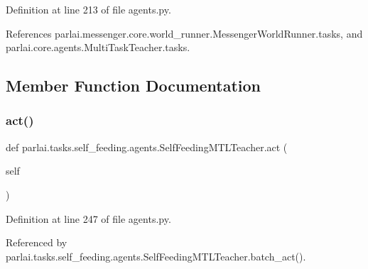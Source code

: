 Definition at line 213 of file agents.\+py.



References parlai.\+messenger.\+core.\+world\+\_\+runner.\+Messenger\+World\+Runner.\+tasks, and parlai.\+core.\+agents.\+Multi\+Task\+Teacher.\+tasks.



\subsection{Member Function Documentation}
\mbox{\label{classparlai_1_1tasks_1_1self__feeding_1_1agents_1_1SelfFeedingMTLTeacher_ac4ee43a50c54d2033be6eb5731650ab3}} 
\subsubsection{\texorpdfstring{act()}{act()}}
{\footnotesize\ttfamily def parlai.\+tasks.\+self\+\_\+feeding.\+agents.\+Self\+Feeding\+M\+T\+L\+Teacher.\+act (\begin{DoxyParamCaption}\item[{}]{self }\end{DoxyParamCaption})}



Definition at line 247 of file agents.\+py.



Referenced by parlai.\+tasks.\+self\+\_\+feeding.\+agents.\+Self\+Feeding\+M\+T\+L\+Teacher.\+batch\+\_\+act().

